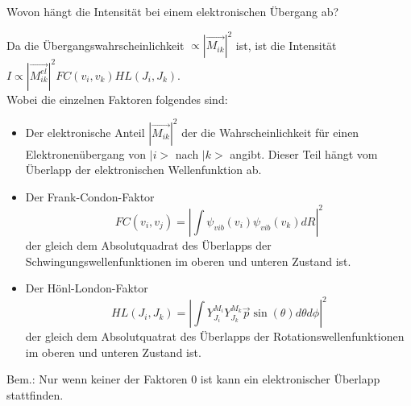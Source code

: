 \documentclass[a5paper,12pt,ngerman,print,grid=front]{kartei}
\begin{document}
	\begin{karte}{
		Wovon hängt die Intensität bei einem elektronischen Übergang ab?
		}
		
		Da die Übergangswahrscheinlichkeit $ \propto |\vec{M_{ik}}|^2 $ ist, ist die Intensität $ I \propto |\vec{M_{ik}^{el}}|^2 FC(v_i, v_k) HL(J_i, J_k)  $. 
		\\
		Wobei die einzelnen Faktoren folgendes sind: \\
		\begin{itemize}
			\item Der elektronische Anteil $ |\vec{M_{ik}} |^2 $ der die Wahrscheinlichkeit für einen Elektronenübergang von $ | i > $ nach $ |k> $ angibt. Dieser Teil hängt vom Überlapp der elektronischen Wellenfunktion ab.
			\item Der Frank-Condon-Faktor
			$$  FC(v_i,v_j) = \left|    \int  \psi_{vib}(v_i)    \psi_{vib}(v_k)  dR  \right| ^2     $$
			der gleich dem Absolutquadrat des Überlapps der Schwingungswellenfunktionen im oberen und unteren Zustand ist.
			\item Der Hönl-London-Faktor
			$$   HL(  J_i, J_k  )  =  \left|    \int Y_{J_{i}}^{ M_i }    Y_{J_{k}}^{ M_k } \vec{p} \sin(\theta) d\theta d\phi    \right|^2    $$
			der gleich dem Absolutquatrat des Überlapps der Rotationswellenfunktionen im oberen und unteren Zustand ist.
		\end{itemize}
		Bem.: Nur wenn keiner der Faktoren 0 ist kann ein elektronischer Überlapp stattfinden.
	\end{karte}
	
	
\end{document}
